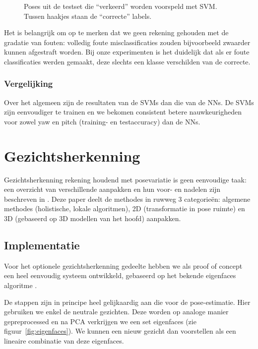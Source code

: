 \documentclass[a4paper,dutch,11pt]{scrartcl}
\begin{document}
\begin{figure}[hbpt]\centering
{} \vspace{0.5cm}
 \vspace{0.5cm}
\subfloat[N (P 5\textdegree{})]{\texttt{[image: bs020\_PR\_SU\_0]}}\caption{Poses uit de testset die ``verkeerd'' worden voorspeld met SVM. Tussen haakjes staan de ``correcte'' labels.}
\label{fig:fout}
\end{figure}

Het is belangrijk om op te merken dat we geen rekening gehouden met de gradatie van fouten: volledig foute misclassificaties zouden bijvoorbeeld zwaarder kunnen afgestraft worden. Bij onze experimenten is het duidelijk dat als er foute classificaties werden gemaakt, deze slechts een klasse verschilden van de correcte.


\subsubsection{Vergelijking}
Over het algemeen zijn de resultaten van de SVMs dan die van de NNs. De SVMs zijn eenvoudiger te trainen en we bekomen consistent betere nauwkeurigheden voor zowel yaw en pitch (training- en testaccuracy) dan de NNs.

\section{Gezichtsherkenning}
Gezichtsherkenning rekening houdend met posevariatie is geen eenvoudige taak: een overzicht van verschillende aanpakken en hun voor- en nadelen zijn beschreven in \cite{facerec}. Deze paper deelt de methodes in ruwweg 3 categorie\"en: algemene methodes (holistische, lokale algoritmen), 2D (transformatie in pose ruimte) en 3D (gebaseerd op 3D modellen van het hoofd) aanpakken.

\subsection{Implementatie}
Voor het optionele gezichtsherkenning gedeelte hebben we als proof of concept een heel eenvoudig systeem ontwikkeld, gebaseerd op het bekende eigenfaces algoritme \cite{eigenface}.

De stappen zijn in principe heel gelijkaardig aan die voor de pose-estimatie. Hier gebruiken we enkel de neutrale gezichten. Deze worden op analoge manier gepreprocessed en na PCA verkrijgen we een set eigenfaces (zie figuur~\ref{fig:eigenfaces}). We kunnen een nieuw gezicht dan voorstellen als een lineaire combinatie van deze eigenfaces.
\end{document}
